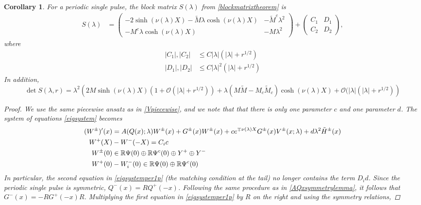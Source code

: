 \documentclass[11pt,reqno]{amsart}
\theoremstyle{plain}
\newtheorem{corollary}[theorem]{Corollary}
\theoremstyle{definition}
\theoremstyle{remark}
\begin{document}
\begin{corollary}\label{corr:2blockmatrix}
For a periodic single pulse, the block matrix $S(\lambda)$ from \cref{blockmatrixtheorem} is 
\begin{align}\label{1pblockmatrix}
S(\lambda) &= 
\begin{pmatrix}
-2 \sinh(\nu(\lambda) X) - \tilde{M}\lambda \cosh(\nu(\lambda) X) & -\tilde{M}^c \lambda^2 \\
-M^c \lambda \cosh(\nu(\lambda)X) & - M \lambda^2
\end{pmatrix} +
\begin{pmatrix}
C_1 & D_1 \\ C_2 & D_2
\end{pmatrix},
\end{align}
where
\begin{align*}
|C_1|, |C_2| &\leq C |\lambda|(|\lambda| + r^{1/2}) \\
|D_1|, |D_2| &\leq C |\lambda|^2(|\lambda| + r^{1/2})
\end{align*}
In addition,
\begin{equation}\label{1pblockmatrixdet}
\det S(\lambda, r) = \lambda^2 \left( 2 M \sinh(\nu(\lambda)X)(1 + \mathcal{O}(|\lambda| + r^{1/2})) + \lambda(M \tilde{M} - M_c \tilde{M}_c)\cosh(\nu(\lambda)X) + \mathcal{O}(|\lambda|(|\lambda| + r^{1/2}) \right)
\end{equation}
\begin{proof}
We use the same piecewise ansatz as in \cref{Vpiecewise}, and we note that that there is only one parameter $c$ and one parameter $d$. The system of equations \cref{eigsystem} becomes
\begin{equation}\label{eigsystemper1p}
\begin{aligned}
(W^\pm)'(x) &= A(Q(x); \lambda) W^\pm(x) + G^\pm(x) W^\pm(x) + c e^{\mp\nu(\lambda)X} G^\pm(x)V^\pm(x; \lambda) + d \lambda^2 \tilde{H}^\pm(x) \\
W^+(X) &- W^-(-X) = C_i c \\
W^\pm(0) &\in \mathbb{R} \Psi(0) \oplus \mathbb{R} \Psi^c(0) \oplus Y^+ \oplus Y^- \\
W^+(0) &- W_i^-(0) \in \mathbb{R} \Psi(0) \oplus \mathbb{R} \Psi^c(0) 
\end{aligned}
\end{equation}
In particular, the second equation in \cref{eigsystemper1p} (the matching condition at the tail) no longer contains the term $D_i d$. Since the periodic single pulse is symmetric, $Q^-(x) = R Q^+(-x)$. Following the same procedure as in \cref{AQxsymmetrylemma}, it follows that $G^-(x) = -R G^+(-x)R$. Multiplying the first equation in \cref{eigsystemper1p} by $R$ on the right and using the symmetry relations,

\end{proof}
\end{corollary}
\end{document}
